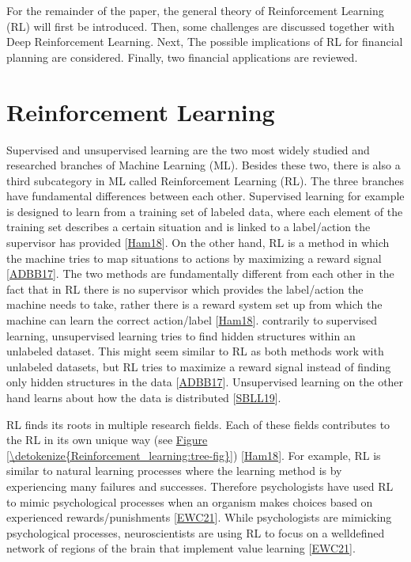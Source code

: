 \documentclass[letterpaper,10pt,english]{jupyterBook}
\begin{document}
\sphinxAtStartPar
For the remainder of the paper, the general theory of Reinforcement Learning (RL) will first be introduced. Then, some challenges are discussed together with Deep Reinforcement Learning. Next, The possible implications of RL for financial planning are considered. Finally, two financial applications are reviewed.


\chapter{Reinforcement Learning}
\label{\detokenize{Reinforcement_learning:reinforcement-learning}}\label{\detokenize{Reinforcement_learning::doc}}
\sphinxAtStartPar
Supervised and unsupervised learning are the two most widely studied and researched branches of Machine Learning (ML). Besides these two, there is also a third subcategory in ML called Reinforcement Learning (RL). The three branches have fundamental differences between each other. Supervised learning for example is designed to learn from a training set of labeled data, where each element of the training set describes a certain situation and is linked to a label/action the supervisor has provided {[}\hyperlink{cite.Discussion:id60}{Ham18}{]}. On the other hand, RL is a method in which the machine tries to map situations to actions by maximizing a reward signal {[}\hyperlink{cite.Discussion:id63}{ADBB17}{]}. The two methods are fundamentally different from each other in the fact that in RL there is no supervisor which provides the label/action the machine needs to take, rather there is a reward system set up from which the machine can learn the correct action/label {[}\hyperlink{cite.Discussion:id60}{Ham18}{]}. contrarily to supervised learning, unsupervised learning tries to find hidden structures within an unlabeled dataset. This might seem similar to RL as both methods work with unlabeled datasets, but RL tries to maximize a reward signal instead of finding only hidden structures in the data {[}\hyperlink{cite.Discussion:id63}{ADBB17}{]}. Unsupervised learning on the other hand learns about how the data is distributed {[}\hyperlink{cite.Discussion:id53}{SBLL19}{]}.

\sphinxAtStartPar
RL finds its roots in multiple research fields. Each of these fields contributes to the RL in its own unique way (see \hyperref[\detokenize{Reinforcement_learning:tree-fig}]{Figure \ref{\detokenize{Reinforcement_learning:tree-fig}}}) {[}\hyperlink{cite.Discussion:id60}{Ham18}{]}. For example,  RL is similar to natural learning processes where the learning method is by experiencing many failures and successes. Therefore psychologists have used RL to mimic psychological processes when an organism makes choices based on experienced rewards/punishments {[}\hyperlink{cite.Discussion:id69}{EWC21}{]}. While psychologists are mimicking psychological processes, neuroscientists are using RL to focus on a well\sphinxhyphen{}defined network of regions of the brain that implement value learning {[}\hyperlink{cite.Discussion:id69}{EWC21}{]}.
\end{document}
